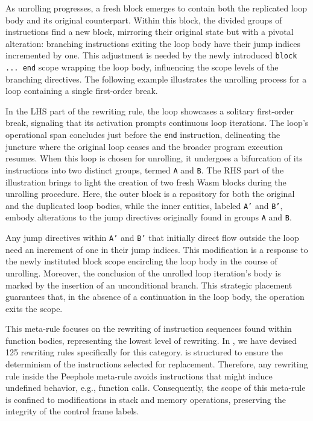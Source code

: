 
As unrolling progresses, a fresh \wasm block emerges to contain both the replicated loop body and its original counterpart. 
Within this block, the divided groups of instructions find a new block, mirroring their original state but with a pivotal alteration: branching instructions exiting the loop body have their jump indices incremented by one. 
This adjustment is needed by the newly introduced \texttt{block ... end} scope wrapping the loop body, influencing the scope levels of the branching directives.
The following example illustrates the unrolling process for a loop containing a single first-order break.



In the LHS part of the rewriting rule, the loop showcases a solitary first-order break, signaling that its activation prompts continuous loop iterations. 
The loop's operational span concludes just before the \texttt{end} instruction, delineating the juncture where the original loop ceases and the broader program execution resumes.
When this loop is chosen for unrolling, it undergoes a bifurcation of its instructions into two distinct groups, termed \texttt{A} and \texttt{B}. 
The RHS part of the illustration brings to light the creation of two fresh Wasm blocks during the unrolling procedure. 
Here, the outer block is a repository for both the original and the duplicated loop bodies, while the inner entities, labeled \texttt{A'} and \texttt{B'}, embody alterations to the jump directives originally found in groups \texttt{A} and \texttt{B}.

Any jump directives within \texttt{A'} and \texttt{B'} that initially direct flow outside the loop need an increment of one in their jump indices. 
This modification is a response to the newly instituted block scope encircling the loop body in the course of unrolling. 
Moreover, the conclusion of the unrolled loop iteration's body is marked by the insertion of an unconditional branch. 
This strategic placement guarantees that, in the absence of a continuation in the loop body, the operation exits the scope.



This meta-rule  focuses on the rewriting of instruction sequences found within function bodies, representing the lowest level of rewriting. 
In \tool, we have devised 125 rewriting rules specifically for this category.
\tool is structured to ensure the determinism of the instructions selected for replacement.
Therefore, any rewriting rule inside the Peephole meta-rule avoids instructions that might induce undefined behavior, e.g., function calls.
Consequently, the scope of this meta-rule is confined to modifications in stack and memory operations, preserving the integrity of the control frame labels.

